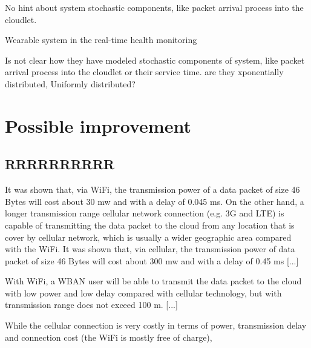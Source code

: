 \documentclass[sigchi]{acmart}
\begin{document}
No hint about system stochastic components, like packet arrival process into the cloudlet.





Wearable system in the real-time health monitoring



Is not clear how they have modeled stochastic components of system, like packet arrival process into the cloudlet or their service time.
are they xponentially distributed, Uniformly distributed?





























\section{Possible improvement}













\subsection{RRRRRRRRRR}

\begin{quoting}[font=itshape, begintext={``}, endtext={''\cite[par.~3.1]{MSAReport}}]
It was shown that, via WiFi, the transmission power of a data packet of size 46 Bytes will cost about 30 mw and with a delay of 0.045 ms. On the other hand, a longer transmission range cellular network connection (e.g. 3G and LTE) is capable of transmitting the data packet to the cloud from any location that is cover by cellular network, which is usually a wider geographic area compared with the WiFi. It was shown that, via cellular, the transmission power of data packet of size 46 Bytes will cost about 300 mw and with a delay of 0.45 ms [...]


With WiFi, a WBAN user will be able to transmit the data packet to the cloud with low power and low delay compared with cellular technology, but with transmission range does not exceed 100 m. [...]


While the cellular connection is very costly in terms of power, transmission delay and connection cost (the WiFi is mostly free of charge),
\end{quoting}
\end{document}
